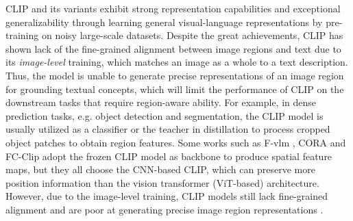 CLIP and its variants \citep{zhou2022learning,yu2022coca,li2022blip} exhibit strong representation capabilities and exceptional generalizability through learning general visual-language representations by pre-training on noisy large-scale datasets. Despite the great achievements, CLIP has shown lack of the fine-grained alignment between image regions and text \cite{zhong2022regionclip,wang2023position, kim2023region,wu2023clipself} due to its \emph{image-level} training, which matches an image as a whole to a text description. Thus, the model is unable to generate precise representations of an image region %
for grounding textual concepts, which will limit the performance of CLIP on the downstream tasks that require region-aware ability. For example, in  dense prediction tasks, e.g. object detection and segmentation, the CLIP model is usually utilized as a classifier \cite{xu2021simple, liang2023open} or the teacher in distillation \cite{gu2021open, du2022learning} to process %
cropped object patches %
to obtain region features. Some works such as F-vlm \cite{kuo2023fvlm}, CORA \cite{wu2023cora} and FC-Clip \cite{yu2024fcclip} adopt the frozen CLIP model as backbone to produce spatial feature maps, but they all choose  the %
CNN-based CLIP, which can preserve more position information than the vision transformer (ViT-based) architecture. However, due to the image-level training, CLIP models still lack fine-grained alignment and are poor at generating precise image region representations \cite{zhong2022regionclip, wang2023position, kim2023region,li2022grounded}.

